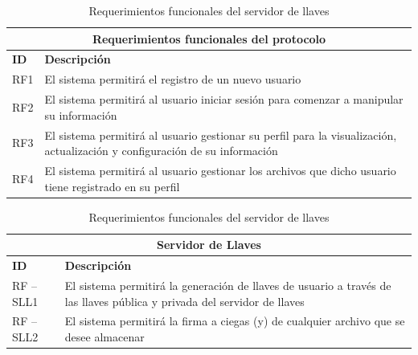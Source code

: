 \begin{table}[htb]
\centering
\begin{tabular}{| p{2cm} |  p{13.5cm} |}
\hline
\multicolumn{2}{|c|}{\textbf{Requerimientos funcionales del protocolo}} \\ \hline
\textbf{ID} &  \textbf{Descripción} \\
\hline \hline
RF1 & El sistema permitirá el registro de un nuevo usuario \\ \hline
RF2 & El sistema permitirá al usuario iniciar sesión para comenzar a manipular su información \\ \hline
RF3 & El sistema permitirá al usuario gestionar su perfil para la visualización, actualización y configuración de su información \\ \hline
RF4 & El sistema permitirá al usuario gestionar los archivos que dicho usuario tiene registrado en su perfil \\ \hline

\end{tabular}
\caption{Requerimientos funcionales del servidor de llaves}
\label{Servidor de Llaves }
\end{table}




\begin{table}[htb]
\centering
\begin{tabular}{| p{2cm} |  p{13.5cm} |}
\hline
\multicolumn{2}{|c|}{\textbf{Servidor de Llaves}} \\ \hline
\textbf{ID} &  \textbf{Descripción} \\
\hline \hline
RF – SLL1 &El sistema permitirá la generación de llaves de usuario a través de las llaves pública y privada  del servidor de llaves \\ \hline
RF – SLL2 & El sistema permitirá la firma a ciegas (y) de cualquier archivo que se desee almacenar\\ \hline
\end{tabular}
\caption{Requerimientos funcionales del servidor de llaves}
\label{Servidor de Llaves }
\end{table}


